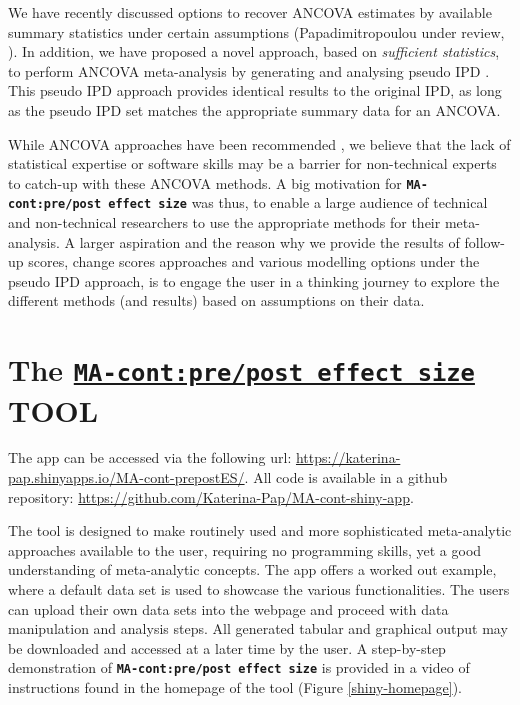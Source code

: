 \documentclass[AMA,STIX1COL]{WileyNJD-v2}
\begin{document}
We have recently discussed options to recover ANCOVA estimates by available summary statistics under certain assumptions (Papadimitropoulou under review, \cite{senn2006change, mckenzie2016impact}). In addition, we have proposed a novel approach, based on \textit{sufficient statistics}, to perform ANCOVA meta-analysis by generating and analysing pseudo IPD \citep{papadimitropoulou2020meta}. This pseudo IPD approach provides identical results to the original IPD, as long as the pseudo IPD set matches the appropriate summary data for an ANCOVA.

While ANCOVA approaches have been recommended \citep{fu2013handling, daly2021nice}, we believe that the lack of statistical expertise or software skills may be a barrier for non-technical experts to catch-up with these ANCOVA methods. A big motivation for \textbf{\texttt{MA-cont:pre/post effect size}} was thus, to enable a large audience of technical and non-technical researchers to use the appropriate methods for their meta-analysis. A larger aspiration and the reason why we provide the results of follow-up scores, change scores approaches and various modelling options under the pseudo IPD approach, is to engage the user in a thinking journey to explore the different methods (and results) based on assumptions on their data.

\section{The \href{https://katerina-pap.shinyapps.io/MA-cont-prepostES/}{\textbf{\texttt{MA-cont:pre/post effect size}}} TOOL}

The app can be accessed via the following url: \url{https://katerina-pap.shinyapps.io/MA-cont-prepostES/}. All code is available in a github repository: \url{https://github.com/Katerina-Pap/MA-cont-shiny-app}.

The tool is designed to make routinely used and more sophisticated meta-analytic approaches available to the user, requiring no programming skills, yet a good understanding of meta-analytic concepts. The app offers a worked out example, where a default data set is used to showcase the various functionalities. The users can upload their own data sets into the webpage and proceed with data manipulation and analysis steps. All generated tabular and graphical output may be downloaded and accessed at a later time by the user.  A step-by-step demonstration of \textbf{\texttt{MA-cont:pre/post effect size}} is provided in a video of instructions found in the homepage of the tool (Figure \ref{shiny-homepage}).
\end{document}
